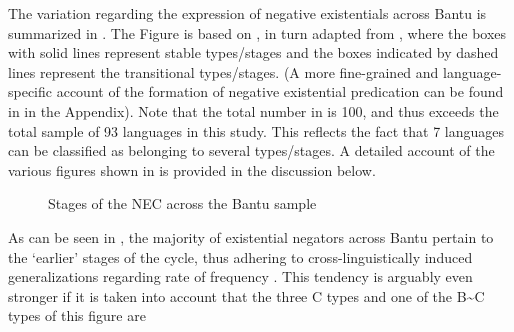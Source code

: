 \documentclass[output=paper]{langscibook}
\begin{document}
The variation regarding the expression of negative existentials across
Bantu is summarized in . The Figure is based on
\citet[146]{Veselinova2016}, in turn adapted from \citet[6]{Croft1991},
where the boxes with solid lines represent stable types\slash stages and the
boxes indicated by dashed lines represent the transitional types\slash stages. (A
more fine-grained and language-specific account of the formation of
negative existential predication can be found in  in the
Appendix). Note that the total number in  is 100,
and thus exceeds the total sample of 93 languages in this study. This
reflects the fact that 7 languages can be classified as belonging to
several types\slash stages. A detailed account of the various figures shown in
 is provided in the discussion below.
\begin{center}\begin{figure}[h]%
\caption{Stages of the NEC across the Bantu
sample}\label{fig:01-bantu-nec}\end{figure}\end{center} 
As can be seen in
, the majority
of existential negators across Bantu pertain to the `earlier' stages of the
cycle, thus adhering to cross-linguistically induced generalizations
regarding rate of frequency \parencites{Croft1991}{Veselinova2016}. This
tendency is arguably even stronger if it is taken into account that the
three C types and one of the B{\textasciitilde}C types of this figure are
\end{document}

